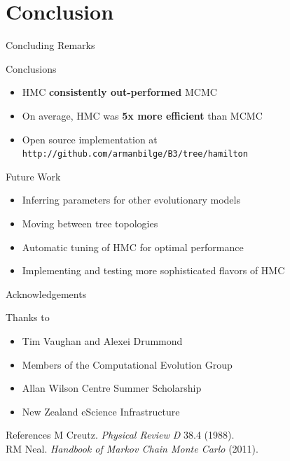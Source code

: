 \documentclass{beamer}
\begin{document}
    \section{Conclusion}

    \begin{frame}{Concluding Remarks}
        \begin{block}{Conclusions}
            \begin{itemize}
                \item HMC \textbf{consistently out-performed} MCMC
                \item On average, HMC was \textbf{5x more efficient} than MCMC
                \item Open source implementation at \texttt{http://github.com/armanbilge/B3/tree/hamilton}
            \end{itemize}
        \end{block}
        \break
        \begin{block}{Future Work}
            \begin{itemize}
                \item Inferring parameters for other evolutionary models
                \item Moving between tree topologies
                \item Automatic tuning of HMC for optimal performance
                \item Implementing and testing more sophisticated flavors of HMC
            \end{itemize}
        \end{block}
    \end{frame}

    \begin{frame}{Acknowledgements}
        \begin{block}{Thanks to}
            \begin{itemize}
                \item Tim Vaughan and Alexei Drummond
                \item Members of the Computational Evolution Group
                \item Allan Wilson Centre Summer Scholarship
                \item New Zealand eScience Infrastructure
            \end{itemize}
        \end{block}
        \begin{block}{References}
            \footnotesize
            M Creutz. \textit{Physical Review D} 38.4 (1988). \texttt{} \\
            RM Neal. \textit{Handbook of Markov Chain Monte Carlo} (2011).
        \end{block}
    \end{frame}
\end{document}

